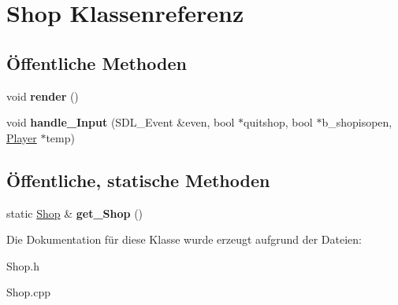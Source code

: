 \hypertarget{class_shop}{\section{Shop Klassenreferenz}
\label{class_shop}
}
\subsection*{Öffentliche Methoden}
\begin{DoxyCompactItemize}
\item 
\hypertarget{class_shop_a6c1786f48bc976b2c7a45dde48ec36ae}{void {\bfseries render} ()}\label{class_shop_a6c1786f48bc976b2c7a45dde48ec36ae}

\item 
\hypertarget{class_shop_ab351ada15116901f29a2d35474883894}{void {\bfseries handle\-\_\-\-Input} (S\-D\-L\-\_\-\-Event \&even, bool $\ast$quitshop, bool $\ast$b\-\_\-shopisopen, \hyperlink{class_player}{Player} $\ast$temp)}\label{class_shop_ab351ada15116901f29a2d35474883894}

\end{DoxyCompactItemize}
\subsection*{Öffentliche, statische Methoden}
\begin{DoxyCompactItemize}
\item 
\hypertarget{class_shop_a4b36d3cd90162ce239b5f7c81d277ca8}{static \hyperlink{class_shop}{Shop} \& {\bfseries get\-\_\-\-Shop} ()}\label{class_shop_a4b36d3cd90162ce239b5f7c81d277ca8}

\end{DoxyCompactItemize}


Die Dokumentation für diese Klasse wurde erzeugt aufgrund der Dateien\-:\begin{DoxyCompactItemize}
\item 
Shop.\-h\item 
Shop.\-cpp\end{DoxyCompactItemize}
